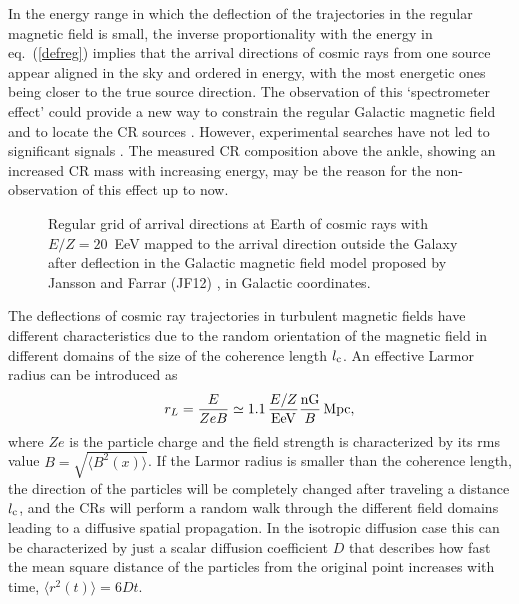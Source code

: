 \documentclass[twoside,12pt]{article}
\begin{document}
 In the energy range in which the deflection of the trajectories in the regular magnetic field is small, the inverse proportionality with the energy in eq.~(\ref{defreg}) implies that the arrival directions of cosmic rays from one source appear aligned in the sky and ordered in energy, with the most energetic ones being closer to the true source direction. The observation of this `spectrometer effect' could provide a new way to constrain the regular Galactic magnetic field and to locate the CR sources \cite{ghmr}. However, experimental searches have not led to significant signals  \cite{augermultiplets}. The measured CR composition above the ankle, showing an increased CR mass  with increasing energy, may be the reason for the non-observation of this effect up to now.
 
\begin{figure}
\begin{center}
\begin{minipage}[t]{8 cm}
\centerline{}
\end{minipage}
\begin{minipage}[t]{16.5 cm}
\caption{Regular grid of arrival directions at Earth of cosmic rays with $E/Z = 20$~EeV mapped to the arrival direction outside the Galaxy after deflection in the Galactic magnetic field model proposed by Jansson and Farrar (JF12) \cite{jf12}, in Galactic coordinates.\label{skysheet}}
\end{minipage}
\end{center}
\end{figure}

 The deflections of cosmic ray trajectories in turbulent magnetic fields have different characteristics due to the random orientation of the magnetic field in different domains of the size of the coherence length $l_{\rm c}$. An effective Larmor radius can be introduced as
\begin{equation}
r_L=\frac{E}{ZeB}\simeq 1.1\, \frac{E/Z}{\rm EeV}\frac{\rm nG}{B}\,{\rm Mpc},
\end{equation}
where $Ze$ is the particle charge and the field strength is characterized by its rms value $B=\sqrt{\langle B^2(x)\rangle}$. If the Larmor radius is smaller than the coherence length, the direction of the particles will be completely changed after traveling a distance $l_{\rm c}$, and the CRs will perform a random walk through the different field domains leading to a diffusive spatial propagation. In the isotropic diffusion case this can be characterized by just a scalar diffusion coefficient $D$ that describes how fast the mean square distance of the particles from the original point increases with time, $\langle r^2(t)\rangle = 6 D t$.
\end{document}
